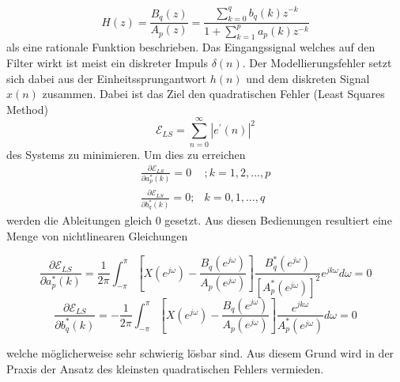 \begin{equation}
H(z)
=
\frac{B_{q}(z)}{A_{p}(z)}
=
\frac{\sum_{k=0}^{q} b_{q}(k) z^{-k}}{1+\sum_{k=1}^{p} a_{p}(k) z^{-k}}
\end{equation}
als eine rationale Funktion beschrieben.
Das Eingangssignal welches auf den Filter wirkt ist meist ein diskreter Impuls $\delta(n)$.
Der Modellierungsfehler setzt sich dabei aus der Einheitssprungantwort $h(n)$ und dem diskreten Signal $x(n)$ zusammen.
Dabei ist das Ziel den quadratischen Fehler (Least Squares Method)
\begin{equation}
\mathcal{E}_{L S}
=
\sum_{n=0}^{\infty}\left|e^{\prime}(n)\right|^{2}
\end{equation}
des Systems zu minimieren.
Um dies zu erreichen   
\begin{equation}\begin{array}{ll}
\frac{\partial \mathcal{E}_{L S}}{\partial a_{p}^{*}(k)}
=
0 
& 
; k=1,2, \ldots, p \\
\frac{\partial \mathcal{E}_{L S}}{\partial b_{q}^{*}(k)}
=
0 ; 
&
 k=0,1, \ldots, q
\end{array}\end{equation}
werden die Ableitungen gleich 0 gesetzt.
Aus diesen Bedienungen resultiert eine Menge von nichtlinearen Gleichungen 

\begin{equation}
\frac{\partial \mathcal{E}_{L S}}{\partial a_{p}^{*}(k)}
=
\frac{1}{2 \pi} 
\int_{-\pi}^{\pi}
\left[X\left(e^{j \omega}\right)-\frac{B_{q}\left(e^{j \omega}\right)}{A_{p}\left(e^{j \omega}\right)}\right] 
\frac{B_{q}^{*}\left(e^{j \omega}\right)}{\left[A_{p}^{*}\left(e^{j \omega}\right)\right]^{2}} 
e^{j k \omega} d \omega
=
0
\end{equation}
\begin{equation}
\frac{\partial \mathcal{E}_{L S}}{\partial b_{q}^{*}(k)}
=
-\frac{1}{2 \pi} 
\int_{-\pi}^{\pi}
\left[X\left(e^{j \omega}\right)-\frac{B_{q}\left(e^{j \omega}\right)}{A_{p}\left(e^{j \omega}\right)}\right] 
\frac{e^{j k \omega}}{A_{p}^{*}\left(e^{j \omega}\right)} d \omega
=
0
\end{equation}


welche möglicherweise sehr schwierig lösbar sind.
Aus diesem Grund wird in der Praxis der Ansatz des kleinsten quadratischen Fehlers vermieden. 


\begin{figure}
	\centering
	\tikzset{>=latex}
\end{figure}






